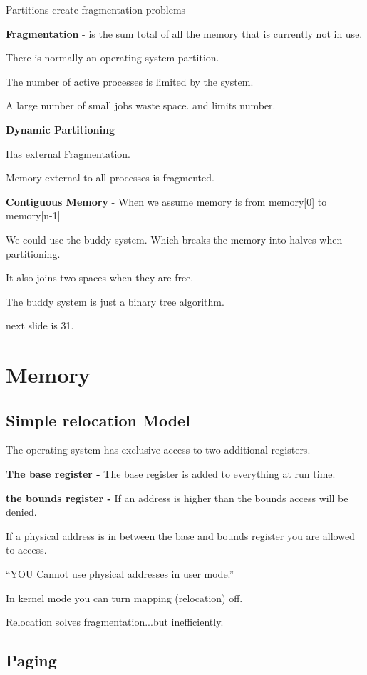 \documentclass{article}
\begin{document}
Partitions create fragmentation problems

{\bf Fragmentation} - is the sum total of all the memory that is currently not in use.

There is normally an operating system partition.

The number of active processes is limited by the system.

A large number of small jobs waste space. and limits number.

{\bf Dynamic Partitioning}

Has external Fragmentation.

Memory external to all processes is fragmented.

{\bf Contiguous Memory} - When we assume memory is from memory[0] to memory[n-1]

We could use the buddy system. Which breaks the memory into halves when partitioning.

It also joins two spaces when they are free.

The buddy system is just a binary tree algorithm.

next slide is 31.

\section*{Memory}

\subsection*{Simple relocation Model}

The operating system has exclusive access to two additional registers.

{\bf The base register -} The base register is added to everything at run time.

{\bf the bounds register -} If an address is higher than the bounds access will be denied.

If a physical address is in between the base and bounds register you are allowed to access.

``YOU Cannot use physical addresses in user mode.''

In kernel mode you can turn mapping (relocation) off.

Relocation solves fragmentation...but inefficiently. 

\subsection*{Paging}
\end{document}
